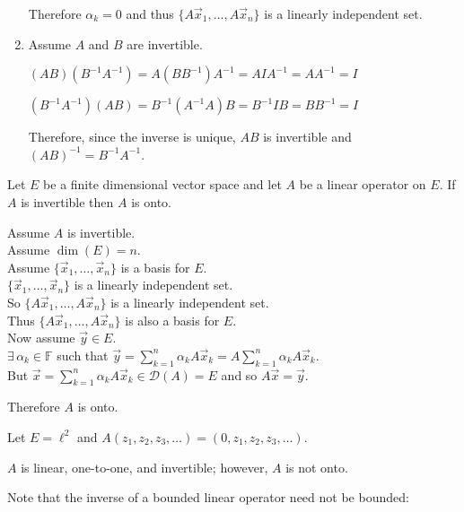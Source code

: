 \documentclass[letterpaper,12pt,fleqn]{article}
\newcommand{\md}{\mathcal{D}}
\newcommand{\vx}{\vec{x}}
\newcommand{\vy}{\vec{y}}
\newcommand{\F}{\mathbb{F}}
\renewcommand{\a}{\alpha}
\begin{document}
\begin{theproof}
\begin{enumerate}
    Therefore $\a_k=0$ and thus $\{A\vx_1,\ldots,A\vx_n\}$ is a linearly
    independent set.

  \item Assume $A$ and $B$ are invertible.

    $(AB)(B^{-1}A^{-1})=A(BB^{-1})A^{-1}=AIA^{-1}=AA^{-1}=I$

    $(B^{-1}A^{-1})(AB)=B^{-1}(A^{-1}A)B=B^{-1}IB=BB^{-1}=I$

    Therefore, since the inverse is unique, $AB$ is invertible and
    $(AB)^{-1}=B^{-1}A^{-1}$.
  \end{enumerate}
\end{theproof}

\begin{corollary}
  Let $E$ be a finite dimensional vector space and let $A$ be a linear
  operator on $E$. If $A$ is invertible then $A$ is onto.
\end{corollary}

\begin{theproof}
  Assume $A$ is invertible. \\
  Assume $\dim(E)=n$. \\
  Assume $\{\vx_1,\ldots,\vx_n\}$ is a basis for $E$. \\
  $\{\vx_1,\ldots,\vx_n\}$ is a linearly independent set. \\
  So $\{A\vx_1,\ldots,A\vx_n\}$ is a linearly independent set. \\
  Thus $\{A\vx_1,\ldots,A\vx_n\}$ is also a basis for $E$. \\
  Now assume $\vy\in E$. \\
  $\exists\,\a_k\in\F$ such that $\vy=\sum_{k=1}^n\a_kA\vx_k=
  A\sum_{k=1}^n\a_kA\vx_k$. \\
  But $\vx=\sum_{k=1}^n\a_kA\vx_k\in \md(A)=E$ and so $A\vx=\vy$.

  Therefore $A$ is onto.
\end{theproof}

\begin{example}
  Let $E=\ell^2$ and $A(z_1,z_2,z_3,\ldots)=(0,z_1,z_2,z_3,\ldots)$.

  $A$ is linear, one-to-one, and invertible; however, $A$ is not onto.
\end{example}

Note that the inverse of a bounded linear operator need not be bounded:
\end{document}
